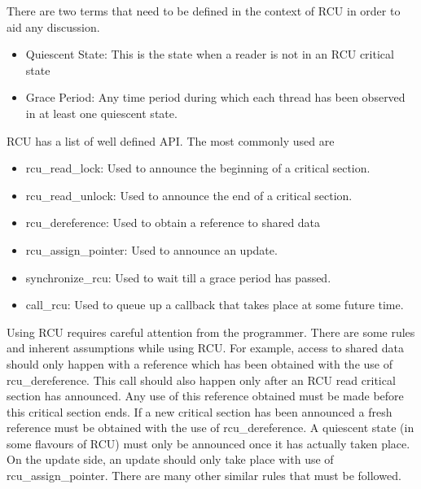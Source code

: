 There are two terms that need to be defined in the context of RCU in order to aid
any discussion.
\begin{itemize}
\item{Quiescent State}: This is the state when a reader is not in an RCU critical state
\item{Grace Period}: Any time period during which each thread has been observed in at least one quiescent state.
\end{itemize}

RCU has a list of well defined API. The most commonly used are
\begin{itemize}
\item{rcu\_read\_lock}: Used to announce the beginning of a critical section.
\item{rcu\_read\_unlock}: Used to announce the end of a critical section.
\item{rcu\_dereference}: Used to obtain a reference to shared data
\item{rcu\_assign\_pointer}: Used to announce an update.
\item{synchronize\_rcu}: Used to wait till a grace period has passed.
\item{call\_rcu}: Used to queue up a callback that takes place at some future time.
\end{itemize}


Using RCU requires careful attention from the programmer. There are some rules
and inherent assumptions while using RCU. For example, access to shared data
should only happen with a reference which has been obtained with the use of
rcu\_dereference. This call should also happen only after an RCU read critical
section has announced. Any use of this reference obtained must be made before
this critical section ends. If a new critical section has been announced a
fresh reference must be obtained with the use of rcu\_dereference. A quiescent
state (in some flavours of RCU) must only be announced once it has actually
taken place. On the update side, an update should only take place with use
of rcu\_assign\_pointer. There are many other similar rules that must be
followed.
